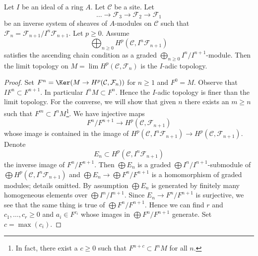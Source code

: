 \begin{lemma}
\label{lemma-topology-I-adic-general}
Let $I$ be an ideal of a ring $A$. Let $\mathcal{C}$ be a site. Let
$$
\ldots \to \mathcal{F}_3 \to \mathcal{F}_2 \to \mathcal{F}_1
$$
be an inverse system of sheaves of $A$-modules on $\mathcal{C}$ such that
$\mathcal{F}_n = \mathcal{F}_{n + 1}/I^n\mathcal{F}_{n + 1}$.
Let $p \geq 0$. Assume
$$
\bigoplus\nolimits_{n \geq 0} H^p(\mathcal{C}, I^n\mathcal{F}_{n + 1})
$$
satisfies the ascending chain condition as a graded
$\bigoplus_{n \geq 0} I^n/I^{n + 1}$-module.
Then the limit topology on $M = \lim H^p(\mathcal{C}, \mathcal{F}_n)$
is the $I$-adic topology.
\end{lemma}

\begin{proof}
Set $F^n = \Ker(M \to H^p(\mathcal{C}, \mathcal{F}_n))$ for $n \geq 1$ and
$F^0 = M$.
Observe that $I F^n \subset F^{n + 1}$. In particular $I^n M \subset F^n$.
Hence the $I$-adic topology is finer than the limit topology. For
the converse, we will show that given $n$
there exists an $m \geq n$ such that $F^m \subset I^nM$\footnote{In fact,
there exist a $c \geq 0$ such that $F^{n + c} \subset I^nM$ for all $n$.}.
We have injective maps
$$
F^n/F^{n + 1} \longrightarrow H^p(\mathcal{C}, \mathcal{F}_{n + 1})
$$
whose image is contained in the image of
$H^p(\mathcal{C}, I^n\mathcal{F}_{n + 1}) \to
H^p(\mathcal{C}, \mathcal{F}_{n + 1})$.
Denote
$$
E_n \subset H^p(\mathcal{C}, I^n\mathcal{F}_{n + 1})
$$
the inverse image of $F^n/F^{n + 1}$. Then $\bigoplus E_n$ is
a graded $\bigoplus I^n/I^{n + 1}$-submodule of
$\bigoplus H^p(\mathcal{C}, I^n\mathcal{F}_{n + 1})$ and
$\bigoplus E_n \to \bigoplus F^n/F^{n + 1}$ is a homomorphism of graded
modules; details omitted. By assumption $\bigoplus E_n$ is generated by
finitely many homogeneous elements over $\bigoplus I^n/I^{n + 1}$.
Since $E_n \to F^n/F^{n + 1}$ is surjective, we see that
the same thing is true of $\bigoplus F^n/F^{n + 1}$.
Hence we can find $r$ and $c_1, \ldots, c_r \geq 0$ and
$a_i \in F^{c_i}$ whose images in $\bigoplus F^n/F^{n + 1}$ generate.
Set $c = \max(c_i)$.


\end{proof}
